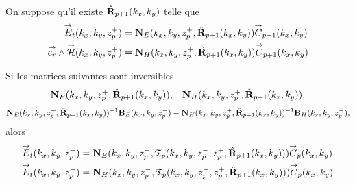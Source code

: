     \begin{prop}%
      \label{prop:plan:transfert:reflexion}{}~

      On suppose qu'il existe \(\hat{\mathbf{R}}_{p+1}(k_x,k_y)\) telle que 
      \begin{align*}
        {\overset{\rightarrow}{E}}_t(k_x,k_y,z_p^+) &= \mathbf{N}_{E}(k_x,k_y,z_p^+,\hat{\mathbf{R}}_{p+1}(k_x,k_y)){\overset{\rightarrow}{C}}_{p+1}(k_x,k_y)
        \\
        {\overset{\rightarrow}{e_r}}\wedge{\overset{\rightarrow}{\mathcal{H}}}(k_x,k_y,z_p^+) &= \mathbf{N}_{H}(k_x,k_y,z_p^+,\hat{\mathbf{R}}_{p+1}(k_x,k_y)){\overset{\rightarrow}{C}}_{p+1}(k_x,k_y)
      \end{align*}

      Si les matrices suivantes sont inversibles
      \begin{align*}
        \mathbf{N}_{E}(k_x,k_y,z_p^+,\hat{\mathbf{R}}_{p+1}(k_x,k_y)), && \mathbf{N}_{H}(k_x,k_y,z_p^+,\hat{\mathbf{R}}_{p+1}(k_x,k_y)),
      \end{align*}
      \begin{align*}
        \mathbf{N}_{E}(k_x,k_y,z_p^+,\hat{\mathbf{R}}_{p+1}(k_x,k_y))^{-1}\mathbf{B}_{E}(k_x,k_y,z_p^-) - \mathbf{N}_{H}(k_x,k_y,z_p^+,\hat{\mathbf{R}}_{p+1}(k_x,k_y))^{-1}\mathbf{B}_{H}(k_x,k_y,z_p^-),
      \end{align*}
      alors
      \begin{align*}
        {\overset{\rightarrow}{E}}_t(k_x,k_y,z_p^-) &= \mathbf{N}_{E}(k_x,k_y,z_p^-,\mathfrak{T}_p(k_x,k_y,z_p^-,z_p^+,\hat{\mathbf{R}}_{p+1}(k_x,k_y))){\overset{\rightarrow}{C}}_{p}(k_x,k_y)
        \\
        {\overset{\rightarrow}{E}}_t(k_x,k_y,z_p^-) &= \mathbf{N}_{H}(k_x,k_y,z_p^-,\mathfrak{T}_p(k_x,k_y,z_p^-,z_p^+,\hat{\mathbf{R}}_{p+1}(k_x,k_y))){\overset{\rightarrow}{C}}_{p}(k_x,k_y)
      \end{align*}
    \end{prop}

